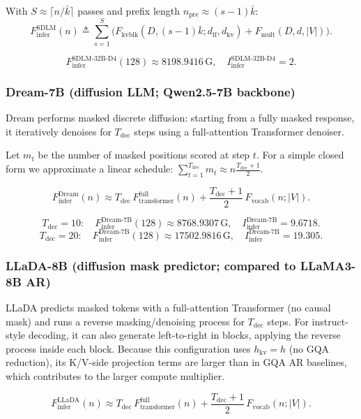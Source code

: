 \documentclass[11pt]{article}
\newcommand{\G}{\mathrm{G}} %
\begin{document}
With $S\approx \lceil n/\bar{k}\rceil$ passes and prefix length $n_{\text{pre}}\approx (s-1)\bar{k}$:
\[
F_{\text{infer}}^{\text{SDLM}}(n)
\triangleq
\sum_{s=1}^{S}
\Big(
F_{\text{kvblk}}(D,(s-1)\bar{k}; d_{\text{ff}}, d_{\text{kv}})
+
F_{\text{mult}}(D,d,|V|)
\Big).
\]

\[
F_{\text{infer}}^{\text{SDLM-32B-D4}}(128)\approx \num{8198.9416}\,\G,
\quad
I_{\text{infer}}^{\text{SDLM-32B-D4}}=\num{2}.
\]

\subsubsection{Dream-7B (diffusion LLM; Qwen2.5-7B backbone)}
\label{app:dream_7b}

Dream performs masked discrete diffusion: starting from a fully masked response, it iteratively denoises
for $T_{\text{dec}}$ steps using a full-attention Transformer denoiser.

Let $m_t$ be the number of masked positions scored at step $t$. For a simple closed form we approximate
a linear schedule: $\sum_{t=1}^{T_{\text{dec}}} m_t \approx n\frac{T_{\text{dec}}+1}{2}$.

\[
F_{\text{infer}}^{\text{Dream}}(n)
\approx
T_{\text{dec}}\,F_{\text{transformer}}^{\text{full}}(n)
+
\frac{T_{\text{dec}}+1}{2}\,F_{\text{vocab}}(n;|V|).
\]

\[
T_{\text{dec}}=10:\quad
F_{\text{infer}}^{\text{Dream-7B}}(128)\approx \num{8768.9307}\,\G,
\quad
I_{\text{infer}}^{\text{Dream-7B}}=\num{9.6718}.
\]
\[
T_{\text{dec}}=20:\quad
F_{\text{infer}}^{\text{Dream-7B}}(128)\approx \num{17502.9816}\,\G,
\quad
I_{\text{infer}}^{\text{Dream-7B}}=\num{19.305}.
\]

\subsubsection{LLaDA-8B (diffusion mask predictor; compared to LLaMA3-8B AR)}
\label{app:llada_8b}

LLaDA predicts masked tokens with a full-attention Transformer (no causal mask) and runs a reverse masking/denoising
process for $T_{\text{dec}}$ steps. For instruct-style decoding, it can also generate left-to-right in blocks, applying the reverse process inside each block.
Because this configuration uses $h_{\text{kv}}{=}h$ (no GQA reduction), its K/V-side projection terms are larger than in GQA AR baselines, which contributes to the larger compute multiplier.

\[
F_{\text{infer}}^{\text{LLaDA}}(n)
\approx
T_{\text{dec}}\,F_{\text{transformer}}^{\text{full}}(n)
+
\frac{T_{\text{dec}}+1}{2}\,F_{\text{vocab}}(n;|V|).
\]
\end{document}
